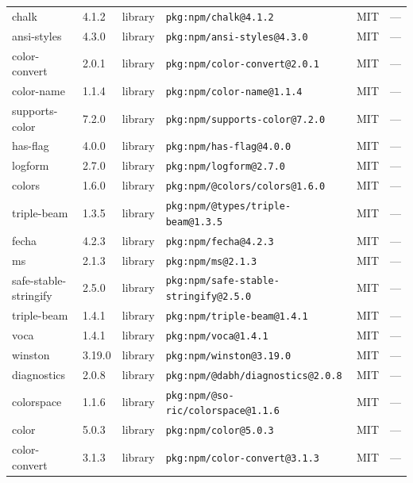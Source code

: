\documentclass[11pt,a4paper]{article}
\begin{document}
\begin{longtable}{|p{4cm}|p{2cm}|p{1.6cm}|p{5cm}|p{1.5cm}|p{3.5cm}|}
\raggedright chalk & 4.1.2 & library & \small\texttt{pkg:npm/chalk@4.1.2} & MIT & \small — \\
\raggedright ansi-styles & 4.3.0 & library & \small\texttt{pkg:npm/ansi-styles@4.3.0} & MIT & \small — \\
\raggedright color-convert & 2.0.1 & library & \small\texttt{pkg:npm/color-convert@2.0.1} & MIT & \small — \\
\raggedright color-name & 1.1.4 & library & \small\texttt{pkg:npm/color-name@1.1.4} & MIT & \small — \\
\raggedright supports-color & 7.2.0 & library & \small\texttt{pkg:npm/supports-color@7.2.0} & MIT & \small — \\
\raggedright has-flag & 4.0.0 & library & \small\texttt{pkg:npm/has-flag@4.0.0} & MIT & \small — \\
\raggedright logform & 2.7.0 & library & \small\texttt{pkg:npm/logform@2.7.0} & MIT & \small — \\
\raggedright colors & 1.6.0 & library & \small\texttt{pkg:npm/@colors/colors@1.6.0} & MIT & \small — \\
\raggedright triple-beam & 1.3.5 & library & \small\texttt{pkg:npm/@types/triple-beam@1.3.5} & MIT & \small — \\
\raggedright fecha & 4.2.3 & library & \small\texttt{pkg:npm/fecha@4.2.3} & MIT & \small — \\
\raggedright ms & 2.1.3 & library & \small\texttt{pkg:npm/ms@2.1.3} & MIT & \small — \\
\raggedright safe-stable-stringify & 2.5.0 & library & \small\texttt{pkg:npm/safe-stable-stringify@2.5.0} & MIT & \small — \\
\raggedright triple-beam & 1.4.1 & library & \small\texttt{pkg:npm/triple-beam@1.4.1} & MIT & \small — \\
\raggedright voca & 1.4.1 & library & \small\texttt{pkg:npm/voca@1.4.1} & MIT & \small — \\
\raggedright winston & 3.19.0 & library & \small\texttt{pkg:npm/winston@3.19.0} & MIT & \small — \\
\raggedright diagnostics & 2.0.8 & library & \small\texttt{pkg:npm/@dabh/diagnostics@2.0.8} & MIT & \small — \\
\raggedright colorspace & 1.1.6 & library & \small\texttt{pkg:npm/@so-ric/colorspace@1.1.6} & MIT & \small — \\
\raggedright color & 5.0.3 & library & \small\texttt{pkg:npm/color@5.0.3} & MIT & \small — \\
\raggedright color-convert & 3.1.3 & library & \small\texttt{pkg:npm/color-convert@3.1.3} & MIT & \small — \\

\end{longtable}
\end{document}
